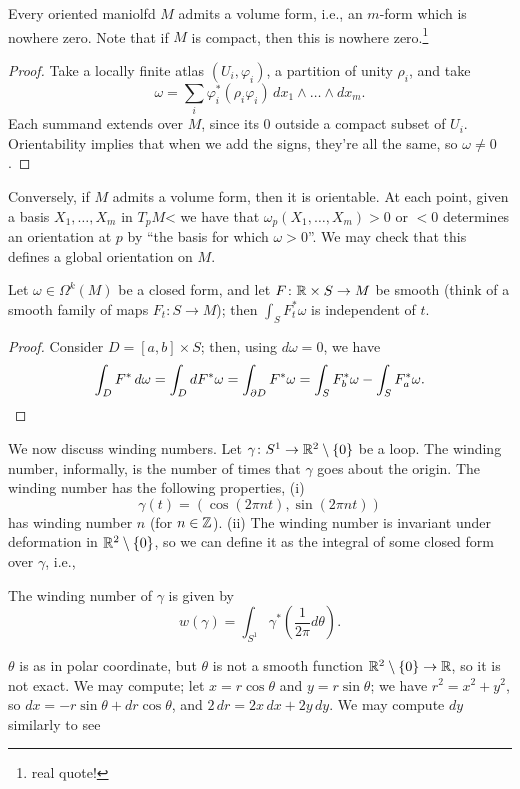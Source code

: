 \newpage
\begin{proposition}[Section 8.4]
    Every oriented maniolfd $M$ admits a volume form, i.e., an $m$-form which is nowhere zero. Note that if $M$ is compact, then this is nowhere zero.\footnote{real quote!}
\end{proposition}
\begin{proof}
    Take a locally finite atlas $(U_i, \varphi_i)$, a partition of unity $\rho_i$, and take
    \[ \omega = \sum_i \varphi_i^\ast (\rho_i \varphi_i)  \, dx_1 \wedge \dots \wedge dx_m. \]
    Each summand extends over $M$, since its $0$ outside a compact subset of $U_i$. Orientability implies that when we add the signs, they're all the same, so $\omega \neq 0$.
\end{proof}
Conversely, if $M$ admits a volume form, then it is orientable. At each point, given a basis $X_1, \dots, X_m$ in $T_p M$< we have that $\omega_p(X_1, \dots, X_m) > 0$ or $< 0$ determines an orientation at $p$ by ``the basis for which $\omega > 0$''. We may check that this defines a global orientation on $M$.
\begin{theorem}
    Let $\omega \in \Omega^k(M)$ be a closed form, and let $F \colon \mathbb R \times S \to M$ be smooth (think of a smooth family of maps $F_t \colon S \to M$); then $\int_S F_t^\ast \omega$ is independent of $t$.
\end{theorem}
\begin{proof}
    Consider $D = [a, b] \times S$; then, using $d\omega = 0$, we have
    \[ \int_D F^\ast \, d\omega = \int_D dF^\ast \omega = \int_{\partial D} F^\ast \omega = \int_S F_b^\ast \omega - \int_S F_a^\ast \omega. \qedhere \]
\end{proof}
We now discuss winding numbers. Let $\gamma \colon S^1 \to \mathbb R^2 \setminus \{0\}$ be a loop. The winding number, informally, is the number of times that $\gamma$ goes about the origin. The winding number has the following properties, (i)
\[ \gamma(t) = (\cos(2\pi n t), \sin(2\pi n t)) \]
has winding number $n$ (for $n \in \mathbb Z$). (ii) The winding number is invariant under deformation in $\mathbb R^2 \setminus \{0\}$, so we can define it as the integral of some closed form over $\gamma$, i.e.,
\begin{definition}[p.200]
    The winding number of $\gamma$ is given by
    \[ w(\gamma) = \int_{S^1} \gamma^\ast\left(\frac{1}{2\pi} d\theta\right). \]
\end{definition}
$\theta$ is as in polar coordinate, but $\theta$ is not a smooth function $\mathbb R^2 \setminus \{0\} \to \mathbb R$, so it is not exact. We may compute; let $x = r \cos \theta$ and $y = r \sin \theta$; we have $r^2 = x^2 + y^2$, so $dx = -r \sin \theta + dr \cos \theta$, and $2 \, dr = 2x \, dx + 2y \, dy$. We may compute $dy$ similarly to see
